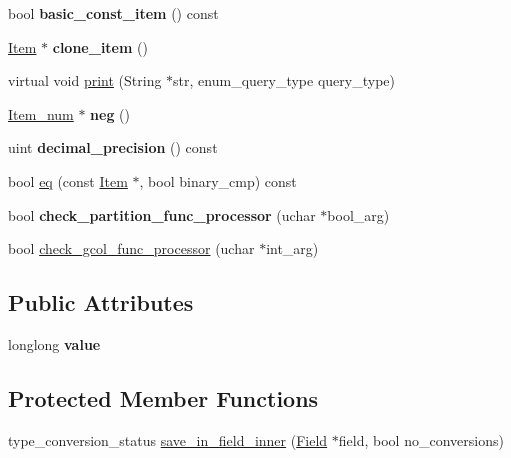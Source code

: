 \begin{DoxyCompactItemize}
\mbox{\label{classItem__int_a8d605f35ca1b745de2aed6ab20aeadda}} 
bool {\bfseries basic\+\_\+const\+\_\+item} () const
\item 
\mbox{\label{classItem__int_a25ded5884eeae8e269288f75d4025f96}} 
\mbox{\hyperlink{classItem}{Item}} $\ast$ {\bfseries clone\+\_\+item} ()
\item 
virtual void \mbox{\hyperlink{classItem__int_a7c2f1ba97b34b9b3379d49e85d81bdc0}{print}} (String $\ast$str, enum\+\_\+query\+\_\+type query\+\_\+type)
\item 
\mbox{\label{classItem__int_a3eff99f17d3fbbddd2cae9651e1fa5bc}} 
\mbox{\hyperlink{classItem__num}{Item\+\_\+num}} $\ast$ {\bfseries neg} ()
\item 
\mbox{\label{classItem__int_ad2bb965775d506260a4c932719d1b7fd}} 
uint {\bfseries decimal\+\_\+precision} () const
\item 
bool \mbox{\hyperlink{classItem__int_a75d827818558edd68522d1823a1fc803}{eq}} (const \mbox{\hyperlink{classItem}{Item}} $\ast$, bool binary\+\_\+cmp) const
\item 
\mbox{\label{classItem__int_a86b29fbc24681cdd81edf47fbff9af1a}} 
bool {\bfseries check\+\_\+partition\+\_\+func\+\_\+processor} (uchar $\ast$bool\+\_\+arg)
\item 
bool \mbox{\hyperlink{classItem__int_ae1ea6b10f3987835fc6d7ec45bb11f94}{check\+\_\+gcol\+\_\+func\+\_\+processor}} (uchar $\ast$int\+\_\+arg)
\end{DoxyCompactItemize}
\subsection*{Public Attributes}
\begin{DoxyCompactItemize}
\item 
\mbox{\label{classItem__int_a85cc66f807870f8af243d58f2aed6332}} 
longlong {\bfseries value}
\end{DoxyCompactItemize}
\subsection*{Protected Member Functions}
\begin{DoxyCompactItemize}
\item 
type\+\_\+conversion\+\_\+status \mbox{\hyperlink{classItem__int_a61fc7a6461f8d3f027fc91b5aeca8d1b}{save\+\_\+in\+\_\+field\+\_\+inner}} (\mbox{\hyperlink{classField}{Field}} $\ast$field, bool no\+\_\+conversions)
\end{DoxyCompactItemize}
